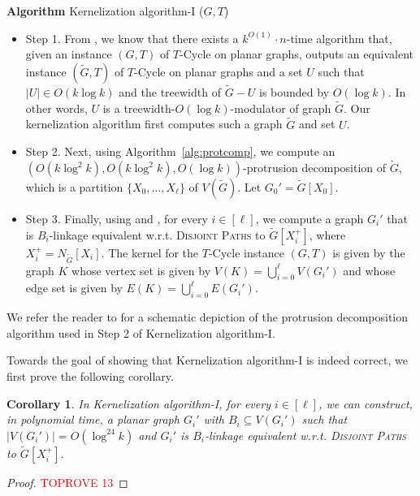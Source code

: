 \documentclass{article}
\newtheorem{corollary}[theorem]{Corollary}
\numberwithin{claimcounter}{lemma}
\newcommand{\dispaths}{\textsc{Disjoint Paths}\xspace}
\begin{document}
\noindent
{\bf Algorithm} {\sc Kernelization algorithm-I} ($G,T$)
\begin{itemize}
\item  Step 1. From , we know that there exists a $k^{O(1)}\cdot n$-time algorithm that, given an instance $(G,T)$ of {\sc $T$-Cycle} on planar graphs, outputs an equivalent instance $(\tilde{G},T)$ of {\sc $T$-Cycle} on planar graphs and  a set $U$ such that $|U|\in O(k\log k)$ and the treewidth of $\tilde{G}-U$ is bounded by $O(\log k)$. In other words, $U$ is a treewidth-$O(\log k)$-modulator of graph $\tilde{G}$. Our kernelization algorithm first computes such a graph $\tilde{G}$ and set $U$.

\item Step 2. Next, using Algorithm~\ref{alg:protcomp}, we compute an $(O(k \log^2 k), O(k \log^2 k), O(\log k))$-protrusion decomposition of $\tilde{G}$, which is a partition $\{X_0,\dots,X_\ell\}$ of $V(\tilde{G})$. Let $G_0' = \tilde{G}[X_0]$.

\item Step 3. Finally, using  and , for every $i \in [\ell]$, we  compute a graph $G_i' $ that is $B_i$-linkage equivalent w.r.t. \dispaths to $\tilde{G}[X_i^+]$, where $X_i^+ = N_{\tilde{G}}[X_i]$. The kernel for the  {\sc $T$-Cycle} instance $(G,T)$ is given by the graph $K$ whose vertex set is given by $V(K) =  \bigcup_{i=0}^\ell V(G_i')$ and whose edge set is given by $E(K) = \bigcup_{i=0}^\ell E(G_i')$.

\end{itemize}  

We refer the reader to  for a schematic depiction of the protrusion decomposition algorithm used in Step 2 of {\sc Kernelization algorithm-I}.

 Towards the goal of showing that {\sc Kernelization algorithm-I} is indeed correct,  we first prove the following corollary.

\begin{corollary} \label{cor:outline:polyKer} 
In {\sc Kernelization algorithm-I}, for every $i \in [\ell]$, we can construct, in polynomial time, a planar graph $G_i'$ with $B_i \subseteq V(G_i')$ such that $|V(G_i')| = O(\log^{24}k)$ and $G_i'$ is $B_i$-linkage equivalent w.r.t. \dispaths to $\tilde{G}[X_i^+]$.
\end{corollary}
\begin{proof}\textcolor{red}{TOPROVE 13}\end{proof}
\end{document}
